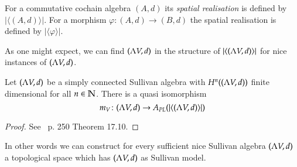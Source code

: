  \begin{Definition}
  For a commutative cochain algebra $(A,d)$ its \emph{spatial realisation} is defined by $| \langle (A,d) \rangle |$. For
  a morphism $\varphi \colon (A,d) \to (B,d)$ the spatial realisation is defined by $|\langle \varphi \rangle|$.
 \end{Definition}

 As one might expect, we can find $(\Lambda V,d)$ in the structure of  $| \langle (\Lambda V,d) \rangle |$ for nice 
 instances of $(\Lambda V,d)$.
 
 \begin{Theorem}
  Let $(\Lambda V,d)$ be a simply connected Sullivan algebra with $H^n((\Lambda V,d))$ finite dimensional for all $n \in \mathbb{N}$.
  There is a quasi isomorphism
  $$m_V \colon (\Lambda V,d) \to A_{PL}(| \langle (\Lambda V,d) \rangle |)$$
 \end{Theorem}

 \begin{proof}
 See~\cite{Felix2001} p. 250 Theorem 17.10.
  
 \end{proof}
 
 In other words we can construct for every sufficient nice Sullivan algebra $(\Lambda V,d)$ 
  a topological space which has $(\Lambda V,d)$ as  Sullivan model.
 
